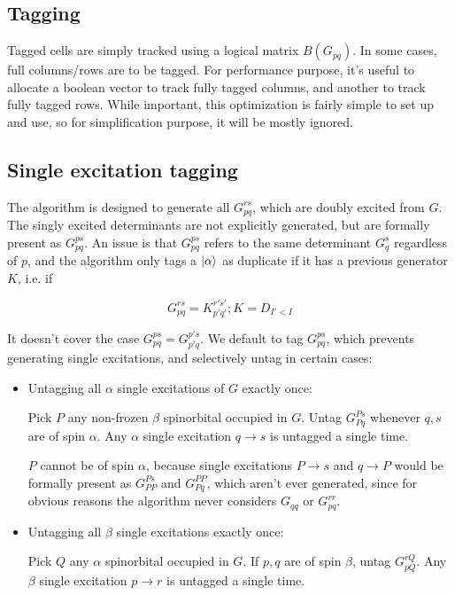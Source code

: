 \documentclass[./thesis.tex]{subfiles}
\begin{document}
\subsection{Tagging}

Tagged cells are simply tracked using a logical matrix $B(G_{pq})$.
In some cases, full columns/rows are to be tagged. For performance purpose, it's useful to allocate a boolean vector to track fully tagged columns, and another to track fully tagged rows. While important, this optimization is fairly simple to set up and use, so for simplification purpose, it will be mostly ignored.


\subsection{Single excitation tagging}

The algorithm is designed to generate all $G_{pq}^{rs}$, which are doubly excited from $G$. The singly excited determinants are not explicitly generated, but are formally present as $G_{pq}^{ps}$.
An issue is that $G_{pq}^{ps}$ refers to the same determinant $G_q^s$ regardless of $p$, and the algorithm only tags a $\ket \alpha$ as duplicate if it has a previous generator $K$, i.e. if

\begin{equation}
G_{pq}^{rs} = {K}_{p'q'}^{r's'} ; K = D_{I'<I}
\end{equation}

It doesn't cover the case $G_{pq}^{ps} = G_{p'q}^{p's}$.
We default to tag $G_{pq}^{ps}$, which prevents generating single excitations, and selectively untag in certain cases:


\begin{itemize}
\item
Untagging all $\alpha$ single excitations of $G$ exactly once:

Pick $P$ any non-frozen $\beta$ spinorbital occupied in $G$. Untag $G_{Pq}^{Ps}$ whenever $q,s$ are of spin $\alpha$. Any $\alpha$ single excitation $q \rightarrow  s$ is untagged a single time.

$P$ cannot be of spin $\alpha$, because single excitations $P \rightarrow  s$ and $q \rightarrow  P$ would be formally present as $G_{PP}^{Ps}$ and $G_{Pq}^{PP}$, which aren't ever generated, since for obvious reasons the algorithm never considers $G_{qq}$ or $G_{pq}^{rr}$.
\item
Untagging all $\beta$ single excitations exactly once:

Pick $Q$ any $\alpha$ spinorbital occupied in $G$. If $p,q$ are of spin $\beta$, untag $G_{pQ}^{rQ}$. Any $\beta$ single excitation $p \rightarrow  r$ is untagged a single time.
\end{itemize}
\end{document}
